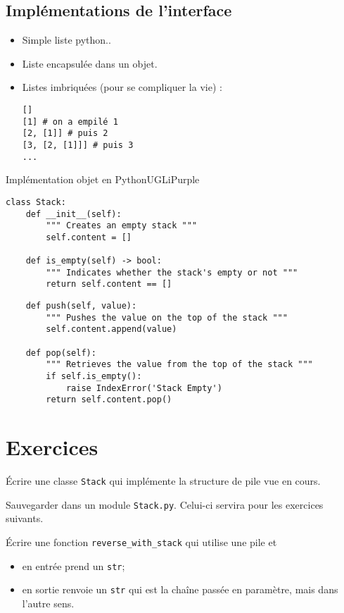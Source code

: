 \documentclass[10pt,cours,firamath,a4paper]{nsi}
\begin{document}
\subsection{Implémentations de l'interface}
\begin{itemize}
	\item Simple liste python..
	\item Liste encapsulée dans un objet.
	\item Listes imbriquées (pour se compliquer la vie) :\\
	      \begin{verbatim}
[]
[1] # on a empilé 1
[2, [1]] # puis 2
[3, [2, [1]]] # puis 3
...
\end{verbatim}
\end{itemize}

\begin{encadrecolore}{Implémentation objet en Python}{UGLiPurple}
\begin{verbatim}
class Stack:
    def __init__(self):
        """ Creates an empty stack """
        self.content = []
        
    def is_empty(self) -> bool:
        """ Indicates whether the stack's empty or not """
        return self.content == []
\end{verbatim}


\begin{verbatim}
    def push(self, value):
        """ Pushes the value on the top of the stack """
        self.content.append(value)

    def pop(self):
        """ Retrieves the value from the top of the stack """
        if self.is_empty():
            raise IndexError('Stack Empty')
        return self.content.pop()
	\end{verbatim}
\end{encadrecolore}

\section{Exercices}

\begin{exercice}
	\'Ecrire une classe \texttt{Stack} qui implémente la structure de pile vue en cours. 

	Sauvegarder dans un module \texttt{Stack.py}. Celui-ci servira pour les exercices suivants.
\end{exercice}

\begin{exercice}
\'Ecrire une fonction \texttt{reverse_with_stack} qui utilise une pile et
\begin{itemize}
	\item 	en entrée prend un \texttt{str};
	\item 	en sortie renvoie un \texttt{str} qui est la chaîne passée en paramètre, mais dans l'autre sens.	
\end{itemize}
\end{exercice}
\end{document}
